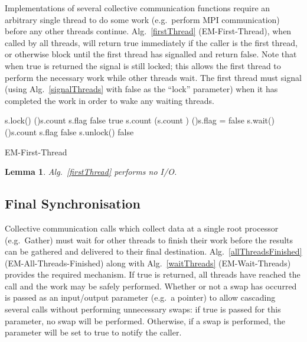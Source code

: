 \documentclass[12pt]{carletoncsthesis}
\newtheorem{lemma}[thm]{Lemma}
\begin{document}
Implementations of several collective communication functions require an
arbitrary single thread to do some work (e.g.\ perform MPI communication) before
any other threads continue.  Alg.~\ref{firstThread} ({\sc EM-First-Thread}),
when called by all threads, will return true immediately if the caller is the
first thread, or otherwise block until the first thread has signalled and
return false.  Note that when true is returned the signal is still locked;
this allows the first thread to perform the necessary work while other
threads wait.  The first thread must signal (using Alg.~\ref{signalThreads}
with false as the ``lock'' parameter) when it has completed the work in
order to wake any waiting threads.

\begin{algorithm}[h]
	\BlankLine
	s.lock()\;
	\If(){s.count }{
		s.flag  false\;
		\Return true\;
	}
	s.count  (s.count )\;
	\If(){s.flag = false}{
		s.wait()\;
	}
	\If(){s.count }{
		s.flag  false\;
	}
	s.unlock()\;
	\Return false\;
	\caption{\sc EM-First-Thread}
	\label{firstThread}
\end{algorithm}

\begin{lemma}
\label{first-io}
Alg.~\ref{firstThread} performs no I/O.
\end{lemma}

\subsection{Final Synchronisation}


Collective communication calls which collect data at a single root processor
(e.g.\ Gather) must wait for other threads to finish their work before
the results can be gathered and delivered to their final destination.
Alg.~\ref{allThreadsFinished} ({\sc EM-All-Threads-Finished}) along with
Alg.~\ref{waitThreads} ({\sc EM-Wait-Threads}) provides the required mechanism.
If true is returned, all threads have reached the call and the work may
be safely performed.  Whether or not a swap has occurred is passed as an
input/output parameter (e.g.\ a pointer) to allow cascading several calls
without performing unnecessary swaps: if true is passed for this parameter,
no swap will be performed.  Otherwise, if a swap is performed, the
parameter will be set to true to notify the caller.  
\end{document}
